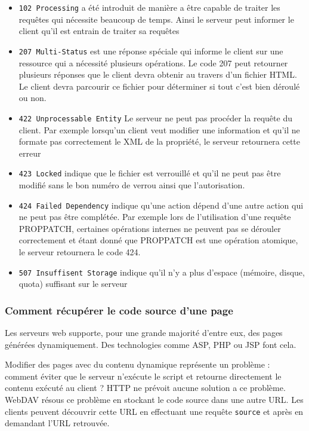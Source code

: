 \documentclass[a4paper, 11pt]{article}
\begin{document}
{			\begin{itemize}
				\item \texttt{102 Processing} a été introduit de manière a être capable de traiter les requêtes qui nécessite beaucoup de temps. Ainsi le serveur peut informer le client qu'il est entrain de traiter sa requêtes
				\item \texttt{207 Multi-Status} est une réponse spéciale qui informe le client sur une ressource qui a nécessité plusieurs opérations. Le code 207 peut retourner plusieurs réponses que le client devra obtenir au travers d'un fichier HTML. Le client devra parcourir ce fichier pour déterminer si tout c'est bien déroulé ou non.
				\item \texttt{422 Unprocessable Entity} Le serveur ne peut pas procéder la requête du client. Par exemple lorsqu'un client veut modifier une information et qu'il ne formate pas correctement le XML de la propriété, le serveur retournera cette erreur 
				\item \texttt{423 Locked} indique que le fichier est verrouillé et qu'il ne peut pas être modifié sans le bon numéro de verrou ainsi que l'autorisation. 
				\item \texttt{424 Failed Dependency} indique qu'une action dépend d'une autre action qui ne peut pas être complétée. Par exemple lors de l'utilisation d'une requête PROPPATCH, certaines opérations internes ne peuvent pas se dérouler correctement et étant donné que PROPPATCH est une opération atomique, le serveur retournera le code 424.
				\item \texttt{507 Insuffisent Storage} indique qu'il n'y a plus d'espace (mémoire, disque, quota) suffisant sur le serveur
			\end{itemize}
			
		\subsubsection{Comment récupérer le code source d'une page}
		
			Les serveurs web supporte, pour une grande majorité d'entre eux, des pages générées dynamiquement. Des technologies comme ASP, PHP ou JSP font cela. 
			
			Modifier des pages avec du contenu dynamique représente un problème : comment éviter que le serveur n'exécute le script et retourne directement le contenu exécuté au client ? HTTP ne prévoit aucune solution a ce problème. WebDAV résous ce problème en stockant le code source dans une autre URL. Les clients peuvent découvrir cette URL en effectuant une requête \texttt{source} et après en demandant l'URL retrouvée.
			
}
\end{document}

